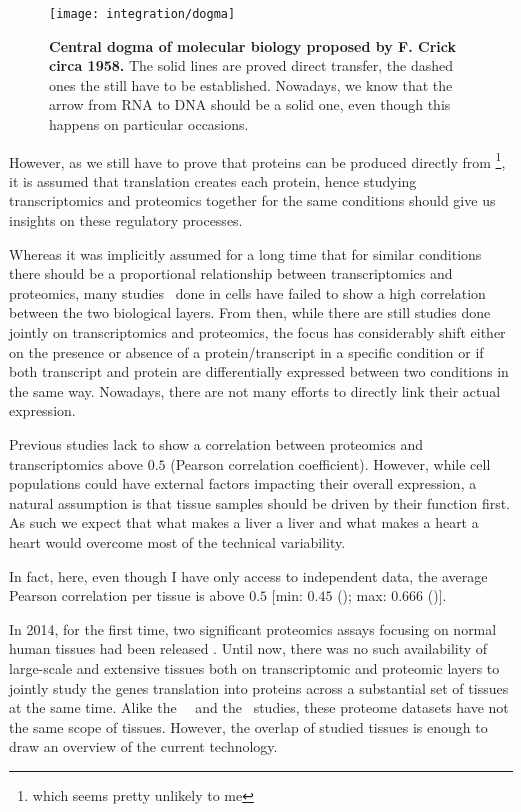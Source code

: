 \begin{figure}%
    \texttt{[image: integration/dogma]}\centering
    \caption[Central dogma of molecular biology proposed by F. Crick circa 1958]
    {\label{fig:dogma}\textbf{Central dogma of molecular biology proposed by
    F. Crick circa 1958.} The solid lines are proved direct transfer, the dashed
    ones the still have to be established. Nowadays, we know that the arrow from RNA
    to DNA should be a solid one, even though this happens on particular occasions.}
\end{figure}

However, as we still have to prove that proteins can be produced directly
from \DNA\footnote{which seems pretty unlikely to me},
it is assumed that translation creates each protein,
hence studying
transcriptomics and proteomics together for the same conditions should give us
insights on these regulatory processes.

Whereas it was implicitly assumed for a long time that for similar conditions
there should be a proportional relationship between transcriptomics and
proteomics, many studies\
done in cells have failed to show a high correlation between the two biological
layers.
From then, while there are still studies done jointly on transcriptomics and proteomics,
the focus has considerably shift either on the presence or absence of
a protein/transcript in a specific condition or if both transcript and protein
are differentially expressed between two conditions in the same way.
Nowadays, there are not many efforts to directly link their actual expression.

Previous studies lack to show a correlation between proteomics and
transcriptomics above $0.5$ (Pearson correlation coefficient).
However, while cell populations could have external factors impacting their
overall expression, a natural assumption is that tissue samples should be driven
by their function first. As such we expect that what makes a liver a liver and
what makes a heart a heart would overcome most of the technical variability.

In fact, here, even though I have only access to independent data, the average
Pearson correlation per tissue is above $0.5$
$[$min: $0.45$ (\Oesophagus); max: $0.666$ (\Liver)$]$.

In 2014, for the first time,
two significant proteomics assays focusing on normal human tissues had been released
\mycite{PandeyData,KusterData}.
Until now, there was no such availability of large-scale and extensive tissues
both on transcriptomic and proteomic layers to jointly study the genes
translation into proteins across a substantial set of tissues
at the same time.
Alike the \uhlen\ \etal\ and the \gtex\ studies,
these proteome datasets have not the same scope of tissues.
However, the overlap of
studied tissues is enough to draw an overview of the current technology.

